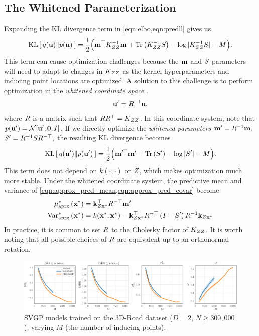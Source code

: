 \subsection{The Whitened Parameterization}

Expanding the KL divergence term in \cref{eqn:elbo,eqn:predll} gives us
%
\begin{equation}
	\kl{ q(\bu) }{ p(\bu) } = \frac{1}{2} \Bigl( \bm^\top \bK_{\bZ\bZ}^{-1} \bm + \tr{ \bK_{\bZ\bZ}^{-1} \bS } - \log \vert \bK_{\bZ\bZ}^{-1} \bS \vert - M \Bigr).
	\label{eqn:kldiv}
\end{equation}
%
This term can cause optimization challenges because the $\mathbf{m}$ and $S$ parameters will need to adapt to changes in $K_{ZZ}$ as the kernel hyperparameters and inducing point locations are optimized.
A solution to this challenge is to perform optimization in the \emph{whitened coordinate space} \cite{matthews2017scalable}.
\[ \mathbf{u}' = R^{-1} \mathbf{u}, \]
where $R$ is a matrix such that $R R^\top = K_{ZZ}$.
In this coordinate system, note that $p(\bu') = \normaldist{ \bu'; \bzero}{\bI}$.
If we directly optimize the \emph{whitened parameters} $\mathbf{m}' = R^{-1} \mathbf{m},$ $S' = R^{-1} S R^{-\top},$
the resulting KL divergence becomes
%
\begin{equation}
	\kl{ q(\bu') }{ p(\bu') } = \frac{1}{2} \Bigl( \bm^{\prime \top} \bm' + \tr{ \bS' } - \log \vert \bS' \vert - M \Bigr).
	\label{eqn:kldiv_whitened}
\end{equation}
%
This term does not depend on $k(\cdot,\cdot)$ or $Z$, which makes optimization much more stable.
Under the whitened coordinate system, the predictive mean and variance of \cref{eqn:approx_pred_mean,eqn:approx_pred_covar} become
%
\begin{align}
  \mu^*_\text{aprx} \left( \mathbf{x}^* \right) &= \mathbf{k}_{Z\mathbf{x}^*}^\top R^{-\top} \mathbf{m}'
  \label{eqn:approx_pred_mean} \\
  \text{Var}^*_\text{aprx} \left( \mathbf{x}^* \right) &= k(\mathbf{x}^*, \mathbf{x}^*) -
    \mathbf{k}_{Z\mathbf{x}^*}^\top R^{-\top} \left( I - S' \right) R^{-1} \mathbf{k}_{Z\mathbf{x}^*}
  \label{eqn:approx_pred_covar}
\end{align}
%
In practice, it is common to set $R$ to the Cholesky factor of $K_{ZZ}$.
It is worth noting that all possible choices of $R$ are equivalent up to an orthonormal rotation.

\begin{figure}[t!]
  \centering
  \includegraphics[width=\linewidth]{figures/3droad.pdf}
  \caption{
    SVGP models trained on the 3D-Road dataset ($D=2$, $N\geq300,\!000$), varying $M$ (the number of inducing points).
  }
  \label{fig:3droad}
\end{figure}

